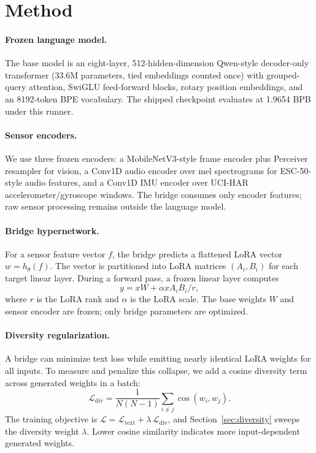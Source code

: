 \documentclass[11pt]{article}
\begin{document}
\section{Method}
\paragraph{Frozen language model.}
The base model is an eight-layer, 512-hidden-dimension Qwen-style decoder-only transformer (33.6M parameters, tied embeddings counted once) with grouped-query attention, SwiGLU feed-forward blocks, rotary position embeddings, and an 8192-token BPE vocabulary. The shipped checkpoint evaluates at 1.9654 BPB under this runner.

\paragraph{Sensor encoders.}
We use three frozen encoders: a MobileNetV3-style frame encoder plus Perceiver resampler for vision, a Conv1D audio encoder over mel spectrograms for ESC-50-style audio features, and a Conv1D IMU encoder over UCI-HAR accelerometer/gyroscope windows. The bridge consumes only encoder features; raw sensor processing remains outside the language model.

\paragraph{Bridge hypernetwork.}
For a sensor feature vector $f$, the bridge predicts a flattened LoRA vector $w = h_\theta(f)$. The vector is partitioned into LoRA matrices $(A_i, B_i)$ for each target linear layer. During a forward pass, a frozen linear layer computes
\[
  y = xW + \alpha x A_i B_i / r,
\]
where $r$ is the LoRA rank and $\alpha$ is the LoRA scale. The base weights $W$ and sensor encoder are frozen; only bridge parameters are optimized.

\paragraph{Diversity regularization.}
A bridge can minimize text loss while emitting nearly identical LoRA weights for all inputs. To measure and penalize this collapse, we add a cosine diversity term across generated weights in a batch:
\[
  \mathcal{L}_\text{div} = \frac{1}{N(N-1)} \sum_{i \ne j} \cos(w_i, w_j).
\]
The training objective is $\mathcal{L} = \mathcal{L}_\text{text} + \lambda\,\mathcal{L}_\text{div}$, and Section~\ref{sec:diversity} sweeps the diversity weight $\lambda$. Lower cosine similarity indicates more input-dependent generated weights.
\end{document}
